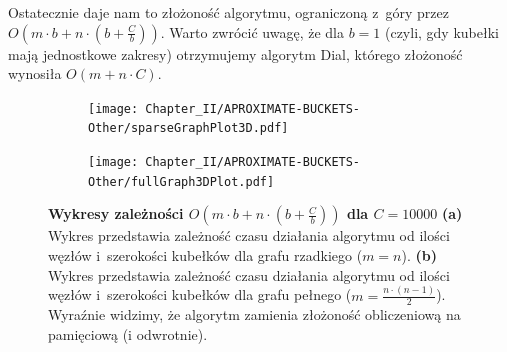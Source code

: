 Ostatecznie daje nam to złożoność algorytmu, ograniczoną z~góry przez $ O \left( m \cdot b + n \cdot \left( b + \frac{C}{b}\right)\right)$. Warto zwrócić uwagę, że dla $b=1$ (czyli, gdy kubełki mają jednostkowe zakresy) otrzymujemy algorytm Dial, którego złożoność wynosiła $ O \left( m + n \cdot C \right)$.

\begin{figure}[!htbp]
	\centering
	\begin{subfigure}[b]{0.45\textwidth}
		\texttt{[image: Chapter\_II/APROXIMATE-BUCKETS-Other/sparseGraphPlot3D.pdf]}
		\caption{}
	\end{subfigure}
	\qquad
	\begin{subfigure}[b]{0.45\textwidth}
		\texttt{[image: Chapter\_II/APROXIMATE-BUCKETS-Other/fullGraph3DPlot.pdf]}
		\caption{}
	\end{subfigure}
	\caption{\textbf{Wykresy zależności $ O \left( m \cdot b + n \cdot \left( b + \frac{C}{b} \right) \right) $ dla $C = 10000$ } \textbf{(a)} Wykres przedstawia zależność czasu działania algorytmu od ilości węzłów i~szerokości kubełków dla grafu rzadkiego ($ m = n $). \textbf{(b)} Wykres przedstawia zależność czasu działania algorytmu od ilości węzłów i~szerokości kubełków dla grafu pełnego ($ m = \frac{n \cdot \left( n - 1\right)}{2}$). Wyraźnie widzimy, że algorytm zamienia złożoność obliczeniową na pamięciową (i odwrotnie). }\label{fig:plotAproximateBucketsComplexity}
\end{figure}


